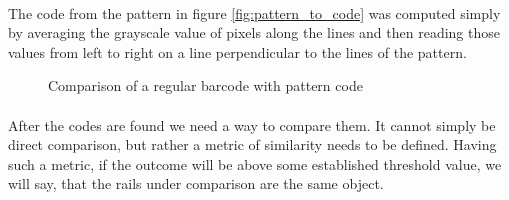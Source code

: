 \paragraph{}
The code from the pattern in figure \ref{fig:pattern_to_code} was computed simply by averaging the grayscale value of pixels along the lines and then reading those values from left to right on a line perpendicular to the lines of the pattern.

\begin{figure}[H]
     \centering
     \hfill
     \caption{Comparison of a regular barcode with pattern code}
     \label{fig:regular_vs_pattern_code}
\end{figure}
\paragraph{}
After the codes are found we need a way to compare them. It cannot simply be direct comparison, but rather a metric of similarity needs to be defined. Having such a metric, if the outcome will be above some established threshold value, we will say, that the rails under comparison are the same object.